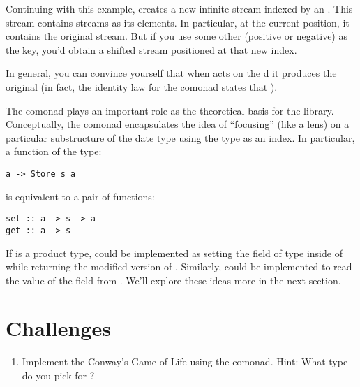 Continuing with this example,  creates a new infinite
stream indexed by an . This stream contains streams as its
elements. In particular, at the current position, it contains the
original stream. But if you use some other  (positive or
negative) as the key, you'd obtain a shifted stream positioned at that
new index.

In general, you can convince yourself that when  acts on
the d  it produces the original
 (in fact, the identity law for the comonad states that
).

The  comonad plays an important role as the theoretical
basis for the  library. Conceptually, the
 comonad encapsulates the idea of ``focusing'' (like
a lens) on a particular substructure of the date type  using
the type  as an index. In particular, a function of the type:

\begin{Verbatim}[commandchars=\\\{\}]
a -> Store s a
\end{Verbatim}
is equivalent to a pair of functions:

\begin{Verbatim}[commandchars=\\\{\}]
set :: a -> s -> a
get :: a -> s
\end{Verbatim}
If  is a product type,  could be implemented as
setting the field of type  inside of  while
returning the modified version of . Similarly, 
could be implemented to read the value of the  field from
. We'll explore these ideas more in the next section.

\section{Challenges}\label{challenges}

\begin{enumerate}
\tightlist
\item
  Implement the Conway's Game of Life using the  comonad.
  Hint: What type do you pick for ?
\end{enumerate}